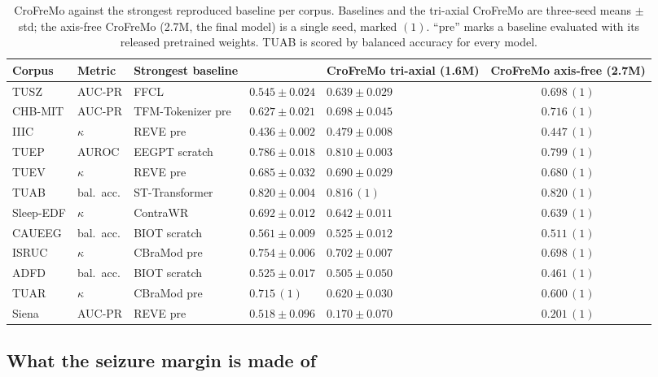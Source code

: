 \begin{table}[t]
\centering
\small
\caption{CroFreMo against the strongest reproduced baseline per corpus.
Baselines and the tri-axial CroFreMo are three-seed means $\pm$ std; the
axis-free CroFreMo (2.7M, the final model) is a single seed, marked $(1)$.
``pre'' marks a baseline evaluated with its released pretrained weights.
TUAB is scored by balanced accuracy for every model.}
\label{tab:main}
\begin{tabular}{lllllc}
\toprule
Corpus & Metric & Strongest baseline & & CroFreMo tri-axial (1.6M) & CroFreMo axis-free (2.7M) \\
\midrule
TUSZ & AUC-PR & FFCL & $0.545 \pm 0.024$ & $0.639 \pm 0.029$ & $\mathbf{0.698}\,(1)$ \\
CHB-MIT & AUC-PR & TFM-Tokenizer pre & $0.627 \pm 0.021$ & $0.698 \pm 0.045$ & $\mathbf{0.716}\,(1)$ \\
IIIC & $\kappa$ & REVE pre & $0.436 \pm 0.002$ & $\mathbf{0.479 \pm 0.008}$ & $0.447\,(1)$ \\
TUEP & AUROC & EEGPT scratch & $0.786 \pm 0.018$ & $\mathbf{0.810 \pm 0.003}$ & $0.799\,(1)$ \\
TUEV & $\kappa$ & REVE pre & $0.685 \pm 0.032$ & $0.690 \pm 0.029$ & $0.680\,(1)$ \\
TUAB & bal.\ acc. & ST-Transformer & $0.820 \pm 0.004$ & $0.816\,(1)$ & $0.820\,(1)$ \\
Sleep-EDF & $\kappa$ & ContraWR & $0.692 \pm 0.012$ & $0.642 \pm 0.011$ & $0.639\,(1)$ \\
CAUEEG & bal.\ acc. & BIOT scratch & $0.561 \pm 0.009$ & $0.525 \pm 0.012$ & $0.511\,(1)$ \\
ISRUC & $\kappa$ & CBraMod pre & $0.754 \pm 0.006$ & $0.702 \pm 0.007$ & $0.698\,(1)$ \\
ADFD & bal.\ acc. & BIOT scratch & $0.525 \pm 0.017$ & $0.505 \pm 0.050$ & $0.461\,(1)$ \\
TUAR & $\kappa$ & CBraMod pre & $0.715\,(1)$ & $0.620 \pm 0.030$ & $0.600\,(1)$ \\
Siena & AUC-PR & REVE pre & $0.518 \pm 0.096$ & $0.170 \pm 0.070$ & $0.201\,(1)$ \\
\bottomrule
\end{tabular}
\end{table}

\subsection{What the seizure margin is made of}
\label{sec:attribution}

